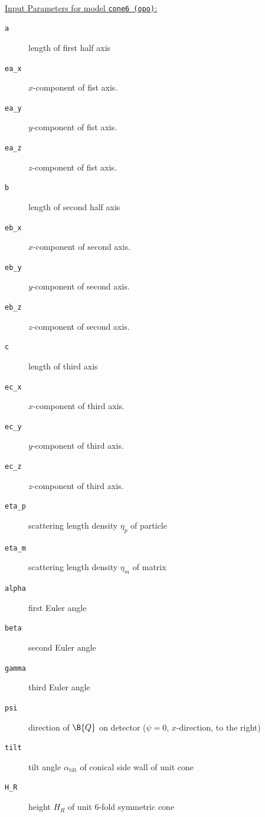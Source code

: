 ~\\
\uline{Input Parameters for model \texttt{cone6 (opo)}:}
\begin{description}
\item[\texttt{a}] length of first half axis
\item[\texttt{ea\_x}] $x$-component of fist axis.
\item[\texttt{ea\_y}] $y$-component of fist axis.
\item[\texttt{ea\_z}] $z$-component of fist axis.
\item[\texttt{b}] length of second half axis
\item[\texttt{eb\_x}] $x$-component of second axis.
\item[\texttt{eb\_y}] $y$-component of second axis.
\item[\texttt{eb\_z}] $z$-component of second axis.
\item[\texttt{c}] length of third axis
\item[\texttt{ec\_x}] $x$-component of third axis.
\item[\texttt{ec\_y}] $y$-component of third axis.
\item[\texttt{ec\_z}] $z$-component of third axis.
\item[\texttt{eta\_p}] scattering length density $\eta_p$ of particle
\item[\texttt{eta\_m}] scattering length density $\eta_m$ of matrix
\item[\texttt{alpha}] first Euler angle
\item[\texttt{beta}] second Euler angle
\item[\texttt{gamma}] third Euler angle
\item[\texttt{psi}] direction of $\B{Q}$ on detector ($\psi=0$, $x$-direction, to the right)
\item[\texttt{tilt}] tilt angle $\alpha_\mathrm{tilt}$ of conical side wall of unit cone
\item[\texttt{H\_R}] height $H_R$ of unit 6-fold symmetric cone
\end{description}

